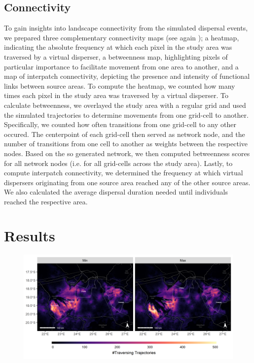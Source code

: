 \documentclass[abstract=on,10pt,a4paper,bibliography=totocnumbered]{article}
\begin{document}
\subsection{Connectivity}
To gain insights into landscape connectivity from the simulated dispersal
events, we prepared three complementary connectivity maps (see again
\citep{Hofmann.2022}); a heatmap, indicating the absolute frequency at which
each pixel in the study area was traversed by a virtual disperser, a betweenness
map, highlighting pixels of particular importance to facilitate movement from
one area to another, and a map of interpatch connectivity, depicting the
presence and intensity of functional links between source areas. To compute the
heatmap, we counted how many times each pixel in the study area was traversed by
a virtual disperser. To calculate betweenness, we overlayed the study area with
a regular grid and used the simulated trajectories to determine movements from
one grid-cell to another. Specifically, we counted how often transitions from
one grid-cell to any other occured. The centerpoint of each grid-cell then
served as network node, and the number of transitions from one cell to another
as weights between the respective nodes. Based on the so generated network, we
then computed betweenness scores for all network nodes (i.e. for all grid-cells
across the study area). Lastly, to compute interpatch connectivity, we
determined the frequency at which virtual dispersers originating from one source
area reached any of the other source areas. We also calculated the average
dispersal duration needed until individuals reached the respective area.

\section{Results}

\begin{figure}
  \begin{center}
  \includegraphics[width = \textwidth]{99_Heatmaps2000.png}
  \caption{}
  \label{Heatmaps}
  \end{center}
\end{figure}
\end{document}

